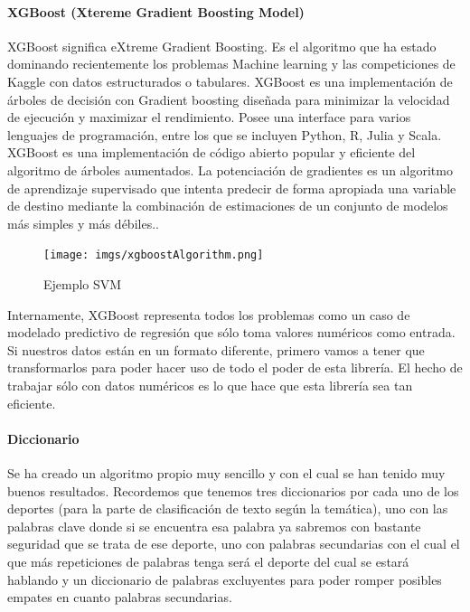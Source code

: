 \documentclass[../all.tex]{subfiles}
\begin{document}
    	\paragraph{XGBoost (Xtereme Gradient Boosting Model)}

			XGBoost significa eXtreme Gradient Boosting. Es el algoritmo que ha estado dominando recientemente los problemas Machine learning y las competiciones de Kaggle con datos estructurados o tabulares. XGBoost es una implementación de árboles de decisión con Gradient boosting diseñada para minimizar la velocidad de ejecución y maximizar el rendimiento. Posee una interface para varios lenguajes de programación, entre los que se incluyen Python, R, Julia y Scala.\\
			
			XGBoost es una implementación de código abierto popular y eficiente del algoritmo de árboles aumentados. La potenciación de gradientes es un algoritmo de aprendizaje supervisado que intenta predecir de forma apropiada una variable de destino mediante la combinación de estimaciones de un conjunto de modelos más simples y más débiles.\cite{XGBoost}.\\
			
		\begin{figure}[H]
			\centering
			\texttt{[image: imgs/xgboostAlgorithm.png]}
			\caption{Ejemplo SVM\cite{XGBoost}}
		\end{figure}
			
			Internamente, XGBoost representa todos los problemas como un caso de modelado predictivo de regresión que sólo toma valores numéricos como entrada. Si nuestros datos están en un formato diferente, primero vamos a tener que transformarlos para poder hacer uso de todo el poder de esta librería. El hecho de trabajar sólo con datos numéricos es lo que hace que esta librería sea tan eficiente.
		 
		 \paragraph{Diccionario}
		
			Se ha creado un algoritmo propio muy sencillo y con el cual se han tenido muy buenos resultados. Recordemos que tenemos tres diccionarios por cada uno de los deportes (para la parte de clasificación de texto según la temática), uno con las palabras clave donde si se encuentra esa palabra ya sabremos con bastante seguridad que se trata de ese deporte, uno con palabras secundarias con el cual el que más repeticiones de palabras tenga será el deporte del cual se estará hablando y un diccionario de palabras excluyentes para poder romper posibles empates en cuanto palabras secundarias.
		
\end{document}

